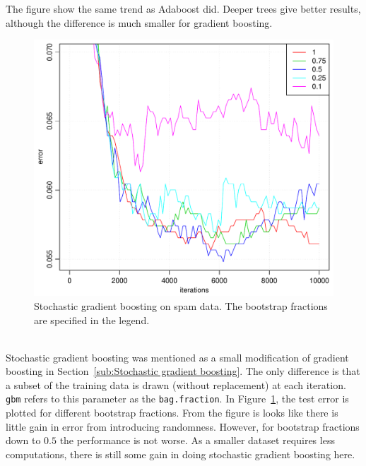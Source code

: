 The figure show the same trend as Adaboost did. Deeper trees give better results, although the difference is much smaller for gradient boosting.
\\
%
\begin{figure}[htbp]
\begin{center}
    \includegraphics[scale=0.5]{./figures/gradboostSpamStoch.pdf}
\end{center}
\caption{Stochastic gradient boosting on spam data. The bootstrap fractions are specified in the legend.}
\label{fig:StochasticGradBoost}
\end{figure}
\\
Stochastic gradient boosting was mentioned as a small modification of gradient boosting in Section~\ref{sub:Stochastic gradient boosting}. The only difference is that a subset of the training data is drawn (without replacement) at each iteration. \verb+gbm+ refers to this parameter as the \verb+bag.fraction+. In Figure~\ref{fig:StochasticGradBoost}, the test error is plotted for different bootstrap fractions. From the figure is looks like there is little gain in error from introducing randomness. However, for bootstrap fractions down to $0.5$ the performance is not worse. As a smaller dataset requires less computations, there is still some gain in doing stochastic gradient boosting here.

